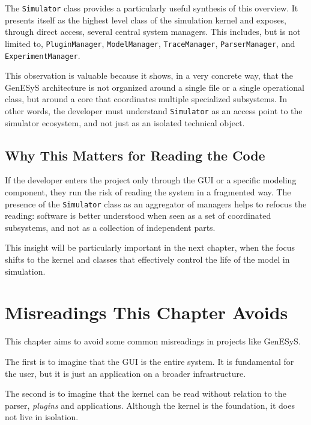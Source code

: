 The \texttt{Simulator} class provides a particularly useful synthesis of this overview. It presents itself as the highest level class of the simulation kernel and exposes, through direct access, several central system managers. This includes, but is not limited to, \texttt{PluginManager}, \texttt{ModelManager}, \texttt{TraceManager}, \texttt{ParserManager}, and \texttt{ExperimentManager}.

This observation is valuable because it shows, in a very concrete way, that the GenESyS architecture is not organized around a single file or a single operational class, but around a core that coordinates multiple specialized subsystems. In other words, the developer must understand \texttt{Simulator} as an access point to the simulator ecosystem, and not just as an isolated technical object.

\subsection{Why This Matters for Reading the Code}
\label{subsec:cap6_por_que_importa_leitura_codigo}

If the developer enters the project only through the GUI or a specific modeling component, they run the risk of reading the system in a fragmented way. The presence of the \texttt{Simulator} class as an aggregator of managers helps to refocus the reading: software is better understood when seen as a set of coordinated subsystems, and not as a collection of independent parts.

This insight will be particularly important in the next chapter, when the focus shifts to the kernel and classes that effectively control the life of the model in simulation.

\section{Misreadings This Chapter Avoids}
\label{sec:cap6_leituras_erradas_evita}

This chapter aims to avoid some common misreadings in projects like GenESyS.

The first is to imagine that the GUI is the entire system. It is fundamental for the user, but it is just an application on a broader infrastructure.

The second is to imagine that the kernel can be read without relation to the parser, \textit{plugins} and applications. Although the kernel is the foundation, it does not live in isolation.

